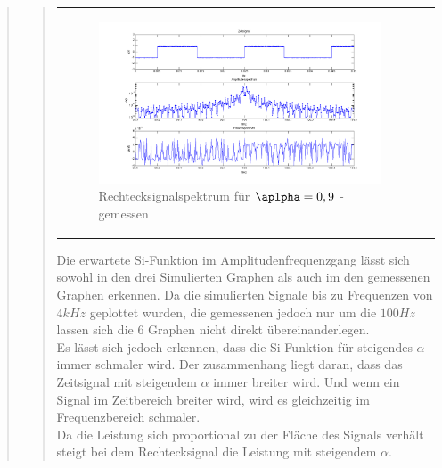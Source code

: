 \begin{quote}
\begin{quote}
\begin{center}
\begin{tabular}{ll}
\begin{minipage}{0.6\textwidth}
                   \begin{figure}[H]
                        \label{fig:}
                        \includegraphics[scale=0.3]{./Bilder/recht_alpha9_-_gemessen.png} %
                        \caption{Rechtecksignalspektrum für $\aplpha = 0,9$ - gemessen}
                    \end{figure}
                 \vspace{-1.5em}

                \end{minipage}

            \end{tabular}
            \end{center}

                        
            Die erwartete Si-Funktion im Amplitudenfrequenzgang lässt sich sowohl in den drei Simulierten Graphen als
            auch im den gemessenen Graphen erkennen. Da die simulierten Signale
            bis zu Frequenzen von $4 kHz$ geplottet wurden, die gemessenen
            jedoch nur um die $100 Hz$ lassen sich die 6 Graphen nicht direkt übereinanderlegen.\\
            Es lässt sich jedoch erkennen, dass die Si-Funktion für steigendes $\alpha$ immer schmaler wird. Der
            zusammenhang liegt daran, dass das Zeitsignal mit steigendem $\alpha$ immer breiter wird. Und wenn ein
            Signal im Zeitbereich breiter wird, wird es gleichzeitig im Frequenzbereich schmaler.\\
            
            Da die Leistung sich proportional zu der Fläche des Signals verhält steigt bei dem Rechtecksignal die
            Leistung mit steigendem $\alpha$.
                     

\end{quote}
\end{quote}
